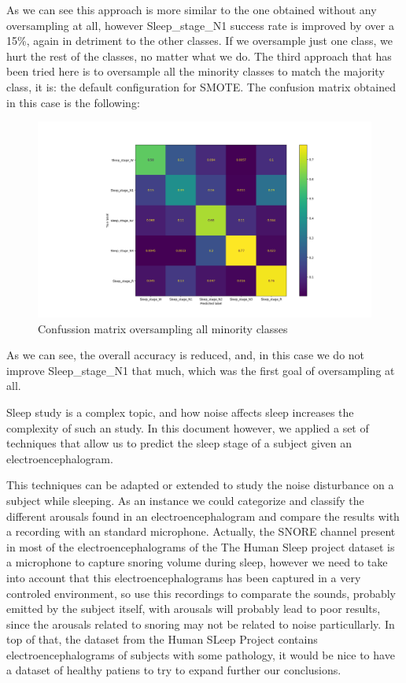 As we can see this approach is more similar to the one obtained without any oversampling at all, however Sleep\_stage\_N1 success rate is improved by over a 15\%, again in detriment to the other classes. If we oversample just one class, we hurt the rest of the classes, no matter what we do. The third approach that has been tried here is to oversample all the minority classes to match the majority class, it is: the default configuration for SMOTE. The confusion matrix obtained in this case is the following:

\begin{figure}[H]
\centering
\hspace*{-2cm}\includegraphics[scale=.5]{figs/cm-da-all.png}
\caption{Confussion matrix oversampling all minority classes}
\label{fig7}
\end{figure}

As we can see, the overall accuracy is reduced, and, in this case we do not improve Sleep\_stage\_N1 that much, which was the first goal of oversampling at all.

Sleep study is a complex topic, and how noise affects sleep increases the complexity of such an study. In this document however, we applied a set of techniques that allow us to predict the sleep stage of a subject given an electroencephalogram. 

This techniques can be adapted or extended to study the noise disturbance on a subject while sleeping. As an instance we could categorize and classify the different arousals found in an electroencephalogram and compare the results with a recording with an standard microphone. Actually, the SNORE channel present in most of the electroencephalograms of the The Human Sleep project dataset is a microphone to capture snoring volume during sleep, however we need to take into account that this electroencephalograms has been captured in a very controled environment, so use this recordings to comparate the sounds, probably emitted by the subject itself, with arousals will probably lead to poor results, since the arousals related to snoring may not be related to noise particullarly. In top of that, the dataset from the Human SLeep Project contains electroencephalograms of subjects with some pathology, it would be nice to have a dataset of healthy patiens to try to expand further our conclusions.

